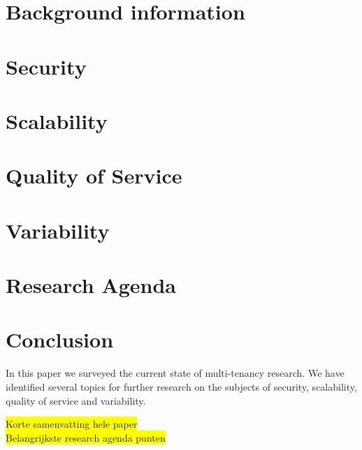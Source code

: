 \documentclass{article}
\newcommand{\highlight}[1]{\colorbox{yellow}{#1}}
\begin{document}
\section{Background information}
\label{sec:bg}


\section{Security}
\label{sec:security}


\section{Scalability}
\label{sec:scalability}


\section{Quality of Service}
\label{sec:qos}


\section{Variability}
\label{sec:variability}


\section{Research Agenda}
\label{sec:ra}


\section{Conclusion}
\label{sec:conclusion}
In this paper we surveyed the current state of multi-tenancy research.
We have identified several topics for further research on the subjects of security, scalability, quality of service and variability.

\highlight{Korte samenvatting hele paper}\\
\highlight{Belangrijkste research agenda punten}



\end{document}
